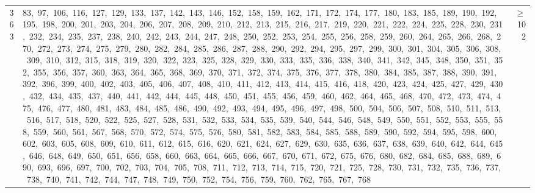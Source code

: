 \begin{longtable}{c|p{}|r}
363 & 83,\ 97,\ 106,\ 116,\ 127,\ 129,\ 133,\ 137,\ 142,\ 143,\ 146,\ 152,\ 158,\ 159,\ 162,\ 171,\ 172,\ 174,\ 177,\ 180,\ 183,\ 185,\ 189,\ 190,\ 192,\ 195,\ 198,\ 200,\ 201,\ 203,\ 204,\ 206,\ 207,\ 208,\ 209,\ 210,\ 212,\ 213,\ 215,\ 216,\ 217,\ 219,\ 220,\ 221,\ 222,\ 224,\ 225,\ 228,\ 230,\ 231,\ 232,\ 234,\ 235,\ 237,\ 238,\ 240,\ 242,\ 243,\ 244,\ 247,\ 248,\ 250,\ 252,\ 253,\ 254,\ 255,\ 256,\ 258,\ 259,\ 260,\ 264,\ 265,\ 266,\ 268,\ 270,\ 272,\ 273,\ 274,\ 275,\ 279,\ 280,\ 282,\ 284,\ 285,\ 286,\ 287,\ 288,\ 290,\ 292,\ 294,\ 295,\ 297,\ 299,\ 300,\ 301,\ 304,\ 305,\ 306,\ 308,\ 309,\ 310,\ 312,\ 315,\ 318,\ 319,\ 320,\ 322,\ 323,\ 325,\ 328,\ 329,\ 330,\ 333,\ 335,\ 336,\ 338,\ 340,\ 341,\ 342,\ 345,\ 348,\ 350,\ 351,\ 352,\ 355,\ 356,\ 357,\ 360,\ 363,\ 364,\ 365,\ 368,\ 369,\ 370,\ 371,\ 372,\ 374,\ 375,\ 376,\ 377,\ 378,\ 380,\ 384,\ 385,\ 387,\ 388,\ 390,\ 391,\ 392,\ 396,\ 399,\ 400,\ 402,\ 403,\ 405,\ 406,\ 407,\ 408,\ 410,\ 411,\ 412,\ 413,\ 414,\ 415,\ 416,\ 418,\ 420,\ 423,\ 424,\ 425,\ 427,\ 429,\ 430,\ 432,\ 434,\ 435,\ 437,\ 440,\ 441,\ 442,\ 444,\ 445,\ 448,\ 450,\ 451,\ 455,\ 456,\ 459,\ 460,\ 462,\ 464,\ 465,\ 468,\ 470,\ 472,\ 473,\ 474,\ 475,\ 476,\ 477,\ 480,\ 481,\ 483,\ 484,\ 485,\ 486,\ 490,\ 492,\ 493,\ 494,\ 495,\ 496,\ 497,\ 498,\ 500,\ 504,\ 506,\ 507,\ 508,\ 510,\ 511,\ 513,\ 516,\ 517,\ 518,\ 520,\ 522,\ 525,\ 527,\ 528,\ 531,\ 532,\ 533,\ 534,\ 535,\ 539,\ 540,\ 544,\ 546,\ 548,\ 549,\ 550,\ 551,\ 552,\ 553,\ 555,\ 558,\ 559,\ 560,\ 561,\ 567,\ 568,\ 570,\ 572,\ 574,\ 575,\ 576,\ 580,\ 581,\ 582,\ 583,\ 584,\ 585,\ 588,\ 589,\ 590,\ 592,\ 594,\ 595,\ 598,\ 600,\ 602,\ 603,\ 605,\ 608,\ 609,\ 610,\ 611,\ 612,\ 615,\ 616,\ 620,\ 621,\ 624,\ 627,\ 629,\ 630,\ 635,\ 636,\ 637,\ 638,\ 639,\ 640,\ 642,\ 644,\ 645,\ 646,\ 648,\ 649,\ 650,\ 651,\ 656,\ 658,\ 660,\ 663,\ 664,\ 665,\ 666,\ 667,\ 670,\ 671,\ 672,\ 675,\ 676,\ 680,\ 682,\ 684,\ 685,\ 688,\ 689,\ 690,\ 693,\ 696,\ 697,\ 700,\ 702,\ 703,\ 704,\ 705,\ 708,\ 711,\ 712,\ 713,\ 714,\ 715,\ 720,\ 721,\ 725,\ 728,\ 730,\ 731,\ 732,\ 735,\ 736,\ 737,\ 738,\ 740,\ 741,\ 742,\ 744,\ 747,\ 748,\ 749,\ 750,\ 752,\ 754,\ 756,\ 759,\ 760,\ 762,\ 765,\ 767,\ 768 & $\ge$ 102 \\

\end{longtable}
